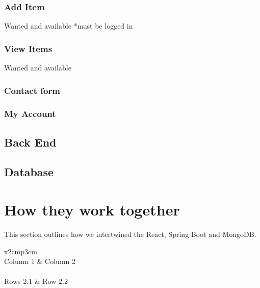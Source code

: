 \subsubsection{Add Item}
Wanted and available
*must be logged in

\subsubsection{View Items}
Wanted and available


\subsubsection{Contact form}


\subsubsection{My Account}





\subsection{Back End}

\subsection{Database}

\section{How they work together}
This section outlines how we intertwined the React, Spring Boot and MongoDB.

\begin{table}[h]
  \centering
  \begin{tabular}{x{2cm}p{3cm}}
    \toprule \\
    Column 1 & Column 2 \\
    \midrule \\
    Rows 2.1 & Row 2.2 \\
    \bottomrule
  \end{tabular}
  \caption{A table.}
  \label{table:mytable}
\end{table}


